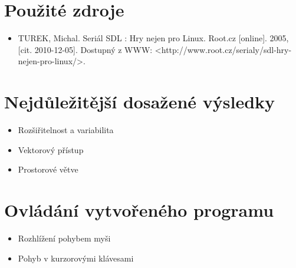\documentclass[11pt,a4paper]{article}
\begin{document}
\section{Použité zdroje}

%

\begin{itemize}
\item TUREK, Michal. Seriál SDL : Hry nejen pro Linux. Root.cz [online]. 2005, [cit. 2010-12-05]. Dostupný z WWW: {\textless}http://www.root.cz/serialy/sdl-hry-nejen-pro-linux/{\textgreater}.
\end{itemize}

\section{Nejdůležitější dosažené výsledky}


\begin{itemize}
\item Rozšiřitelnost a variabilita
\item Vektorový přístup
\item Prostorové větve
\end{itemize}

\section{Ovládání vytvořeného programu}

%

\begin{itemize}
\item Rozhlížení pohybem myši
\item Pohyb v kurzorovými klávesami
\end{itemize}
\end{document}

